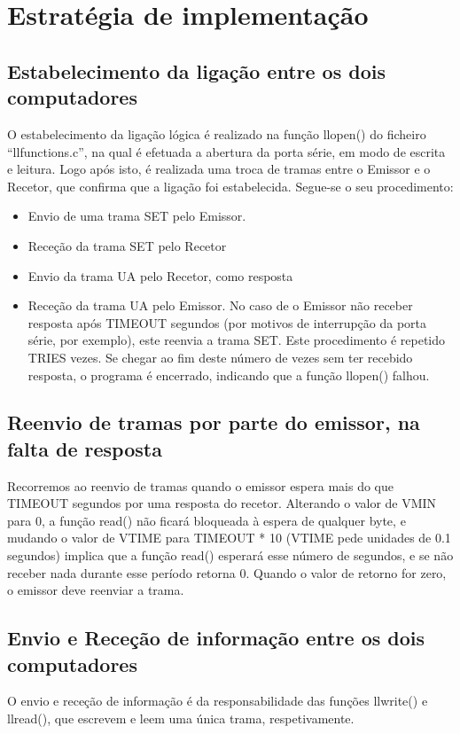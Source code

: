 \documentclass[article, a4paper, 11pt, oneside]{memoir}
\begin{document}
\section{Estratégia de implementação}

\subsection{Estabelecimento da ligação entre os dois computadores}
O estabelecimento da ligação lógica é realizado na função llopen() do ficheiro “llfunctions.c”, na qual é efetuada a abertura da porta série, em modo de escrita e leitura. Logo após isto, é realizada uma troca de tramas entre o Emissor e o Recetor, que confirma que a ligação foi estabelecida. Segue-se o seu procedimento:
\begin{itemize}
	\item Envio de uma trama SET pelo Emissor.
\item Receção da trama SET pelo Recetor
\item Envio da trama UA pelo Recetor, como resposta
\item Receção da trama UA pelo Emissor. No caso de o Emissor não receber resposta após TIMEOUT segundos (por motivos de interrupção da porta série, por exemplo), este reenvia a trama SET. Este procedimento é repetido TRIES vezes. Se chegar ao fim deste número de vezes sem ter recebido resposta, o programa é encerrado, indicando que a função llopen() falhou.
\end{itemize}

\subsection{Reenvio de tramas por parte do emissor, na falta de resposta}
Recorremos ao reenvio de tramas quando o emissor espera mais do que 
TIMEOUT segundos por uma resposta do recetor. 
Alterando o valor de VMIN para 0, a função read() não ficará bloqueada à espera de 
qualquer byte, e mudando o valor de VTIME para TIMEOUT * 10 (VTIME pede unidades de 0.1 segundos) 
implica que a função read() esperará esse número de segundos, e se não receber nada durante 
esse período retorna 0. Quando o valor de retorno for zero, o emissor deve reenviar a trama.

\subsection{Envio e Receção de informação entre os dois computadores}
O envio e receção de informação é da responsabilidade das funções llwrite() e llread(), 
que escrevem e leem uma única trama, respetivamente. 
\end{document}
